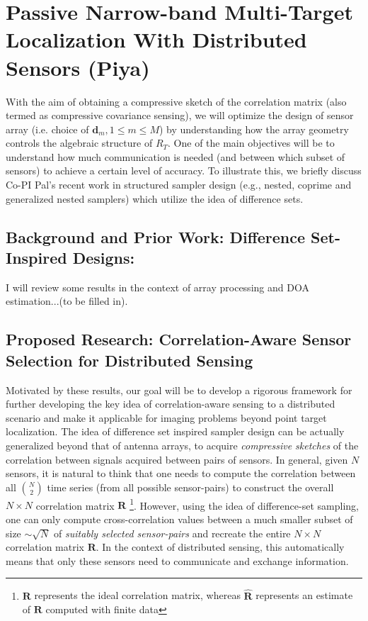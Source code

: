 \section{Passive Narrow-band Multi-Target Localization With Distributed Sensors (Piya)}

With the aim of obtaining a compressive sketch of the correlation matrix (also termed as compressive covariance sensing), we will optimize the design of sensor array (i.e. choice of $\mathbf{d}_m, 1\leq m\leq M$) by understanding how the array geometry controls the algebraic structure of $R_T$. One of the main objectives will be to understand how much communication is needed (and between which subset of sensors) to achieve a certain level of accuracy. To illustrate this, we briefly discuss Co-PI Pal's recent work in structured sampler design (e.g., nested, coprime and generalized nested samplers) which utilize the idea of difference sets.

\subsection{Background and Prior Work: Difference Set-Inspired Designs:} 
I will review some results in the context of array processing and DOA estimation...(to be filled in).
\subsection{Proposed Research: Correlation-Aware Sensor Selection for Distributed Sensing} Motivated by these results, our goal will be to develop a rigorous framework for further developing the key idea of correlation-aware sensing to a distributed scenario and make it applicable for imaging problems beyond point target localization.
The idea of difference set inspired sampler design can be actually generalized beyond that of antenna arrays, to acquire {\em compressive sketches} of the correlation between signals acquired between pairs of sensors. In general, given $N$ sensors, it is natural to think that one needs to compute the correlation between all $N\choose 2$ time series (from all possible sensor-pairs) to construct the overall $N\times N$ correlation matrix $\mathbf{R}$ \footnote{$\mathbf{R}$ represents the ideal correlation matrix, whereas $\mathbf{\hat{R}}$ represents an estimate of $\mathbf{R}$ computed with finite data}. However, using the idea of difference-set sampling, one can only compute  cross-correlation values between a much smaller subset of size $\sim\sqrt{N}$ of {\em suitably selected sensor-pairs} and recreate the entire $N\times N$ correlation matrix $\mathbf{R}$. In the context of distributed sensing, this automatically means that only these sensors need to communicate and exchange information.

